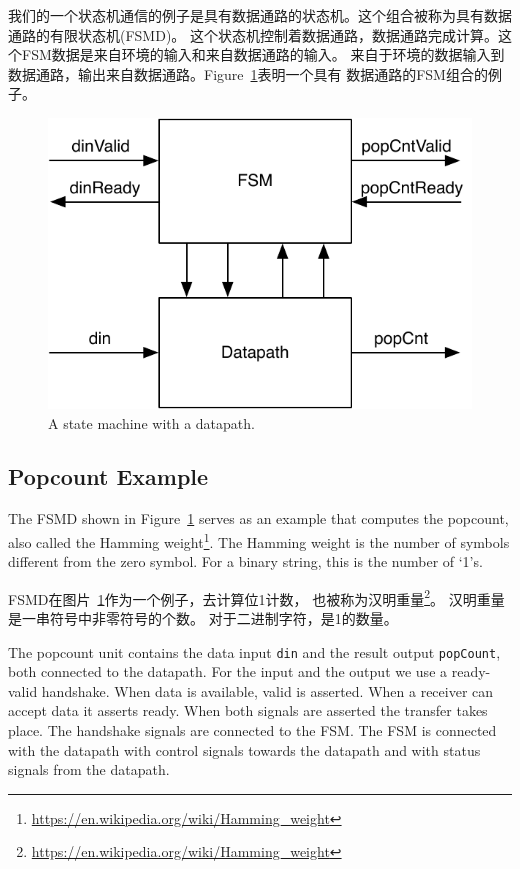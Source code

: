\documentclass[%
    10pt,
    headinclude, footexclude,
    openright, %
    notitlepage,
    cleardoubleempty,
    headsepline,
    pointlessnumbers,
    bibtotoc, idxtotoc,
    ]{scrbook}
\newcommand{\code}[1]{{\small{\texttt{#1}}}}
\newcommand{\scale}{0.7}
\newcommand{\myref}[2]{\href{#1}{#2}}
\renewcommand{\myref}[2]{{#2}{\footnote{\url{#1}}}}
\begin{document}
我们的一个状态机通信的例子是具有数据通路的状态机。这个组合被称为具有数据通路的有限状态机(FSMD)。
这个状态机控制着数据通路，数据通路完成计算。这个FSM数据是来自环境的输入和来自数据通路的输入。
来自于环境的数据输入到数据通路，输出来自数据通路。Figure~\ref{fig:popcnt-fsmd}表明一个具有
数据通路的FSM组合的例子。


\begin{figure}
  \centering
  \includegraphics[scale=\scale]{figures/popcnt-fsmd}
  \caption{A state machine with a datapath.}
  \label{fig:popcnt-fsmd}
\end{figure}

\subsection{Popcount Example}

The FSMD shown in Figure~\ref{fig:popcnt-fsmd} serves as an example that computes the
popcount, also called the \myref{https://en.wikipedia.org/wiki/Hamming_weight}{Hamming weight}.
The Hamming weight is the number of symbols different from the zero symbol.
For a binary string, this is the number of `1's.

FSMD在图片~\ref{fig:popcnt-fsmd}作为一个例子，去计算位1计数，
也被称为\myref{https://en.wikipedia.org/wiki/Hamming_weight}{汉明重量}。
汉明重量是一串符号中非零符号的个数。
对于二进制字符，是1的数量。

The popcount unit contains the data input \code{din} and the result output \code{popCount},
both connected to the datapath. For the input and the output we use a ready-valid handshake.
When data is available, valid is asserted. When a receiver can accept data it asserts ready.
When both signals are asserted the transfer takes place. The handshake signals are connected
to the FSM. The FSM is connected with the datapath with control signals towards the datapath
and with status signals from the datapath.
\end{document}
